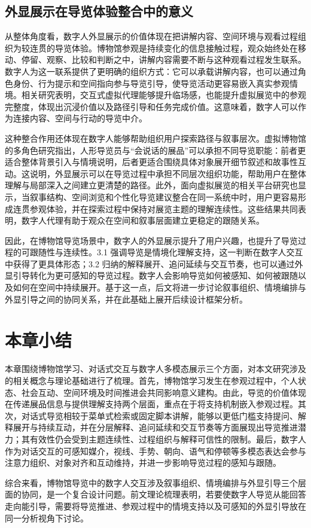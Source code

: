 \subsection{外显展示在导览体验整合中的意义}
从整体角度看，数字人外显展示的价值体现在把讲解内容、空间环境与观看过程组织为较连贯的导览体验。博物馆参观是持续变化的信息接触过程，观众始终处在移动、停留、观察、比较和判断之中，讲解内容需要不断与这种观看过程发生联系。数字人为这一联系提供了更明确的组织方式：它可以承载讲解内容，也可以通过角色身份、行为提示和空间指向参与导览引导，使导览活动更容易嵌入真实参观情境。相关研究表明，交互式虚拟代理能够提升临场感，也能提升虚拟展览中的参观完整度，体现出沉浸价值以及路径引导和任务完成价值\cite{cao2021interactive}。这意味着，数字人可以作为连接内容、空间与行动的导览中介。

这种整合作用还体现在数字人能够帮助组织用户探索路径与叙事层次。虚拟博物馆的多角色研究指出，人形导览员与“会说话的展品”可以承担不同导览职能：前者更适合整体背景引入与情境说明，后者更适合围绕具体对象展开细节叙述和故事性互动\cite{garcia2024speaking}。这说明，外显展示可以在导览过程中承担不同层次组织功能，帮助用户在整体理解与局部深入之间建立更清楚的路径。此外，面向虚拟展览的相关平台研究也显示，当叙事结构、空间浏览和个性化导览建议整合在同一系统中时，用户更容易形成连贯参观体验，并在探索过程中保持对展览主题的理解连续性\cite{zidianakis2021invisible}。这些结果共同表明，数字人代理有助于观众在空间和叙事层面建立更稳定的跟随关系。

因此，在博物馆导览场景中，数字人的外显展示提升了用户兴趣，也提升了导览过程的可跟随性与连续性。3.1 强调导览是情境化理解支持，这一判断在数字人交互中获得了更具体形态；3.2 归纳的解释展开、追问延续与交互节奏，也可以通过外显引导转化为更可感知的导览过程。数字人会影响导览如何被感知、如何被跟随以及如何在空间中持续展开。基于这一点，后文将进一步讨论叙事组织、情境编排与外显引导之间的协同关系，并在此基础上展开后续设计框架分析。

\section{本章小结}
本章围绕博物馆学习、对话式交互与数字人多模态展示三个方面，对本文研究涉及的相关概念与理论基础进行了梳理。首先，博物馆学习发生在参观过程中，个人状态、社会互动、空间环境及时间推进会共同影响意义建构。由此，导览的价值体现在传递展品信息与提供理解支持两个层面，重点在于将支持机制嵌入参观过程。其次，对话式导览相较于菜单式检索或固定脚本讲解，能够以更低门槛支持提问、解释展开与持续互动，并在分层解释、追问延续和交互节奏等方面展现出导览推进潜力；其有效性仍会受到主题连续性、过程组织与解释可信性的限制。最后，数字人作为对话交互的可感知媒介，视线、手势、朝向、语气和停顿等多模态表达会参与注意力组织、对象对齐和互动维持，并进一步影响导览过程的感知与跟随。

综合来看，博物馆导览中的数字人交互涉及叙事组织、情境编排与外显引导三个层面的协同，是一个复合设计问题。前文理论梳理表明，若要使数字人导览从能回答走向能引导，需要将导览推进、参观过程中的情境支持以及可感知的外显引导放在同一分析视角下讨论。
